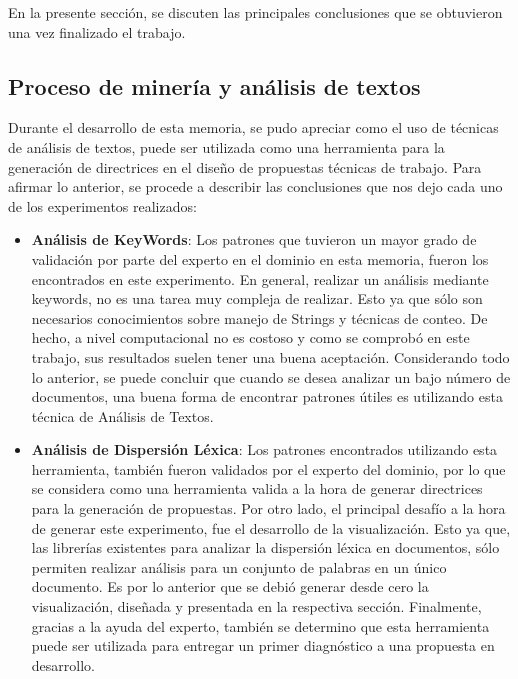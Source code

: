 
    En la presente sección, se discuten las principales conclusiones que se obtuvieron una vez finalizado el trabajo.
    
\subsection{Proceso de minería y análisis de textos}
    Durante el desarrollo de esta memoria, se pudo apreciar como el uso de técnicas de análisis de textos, puede ser utilizada como una herramienta para la generación de directrices en el diseño de propuestas técnicas de trabajo. Para afirmar lo anterior, se procede a describir las conclusiones que nos dejo cada uno de los experimentos realizados:
    
    \begin{itemize}
        \item \textbf{Análisis de KeyWords}: Los patrones que tuvieron un mayor grado de validación por parte del experto en el dominio en esta memoria, fueron los encontrados en este experimento. En general, realizar un análisis mediante keywords, no es una tarea muy compleja de realizar. Esto ya que sólo son necesarios conocimientos sobre manejo de Strings y técnicas de conteo. De hecho, a nivel computacional no es costoso y como se comprobó en este trabajo, sus resultados suelen tener una buena aceptación.  Considerando todo lo anterior, se puede concluir que cuando se desea analizar un bajo número de documentos, una buena forma de encontrar patrones útiles es utilizando esta técnica de Análisis de Textos. 
        \item \textbf{Análisis de Dispersión Léxica}: Los patrones encontrados utilizando esta herramienta, también fueron validados por el experto del dominio, por lo que se considera como una herramienta valida a la hora de generar directrices para la generación de propuestas. Por otro lado, el principal desafío a la hora de generar este experimento, fue el desarrollo de la visualización. Esto ya que, las librerías existentes para analizar la dispersión léxica en documentos, sólo permiten realizar análisis para un conjunto de palabras en un único documento. Es por lo anterior que se debió generar desde cero la visualización, diseñada y presentada en la respectiva sección. Finalmente, gracias a la ayuda del experto, también se determino que esta herramienta puede ser utilizada para entregar un primer diagnóstico a una propuesta en desarrollo. 

\end{itemize}
